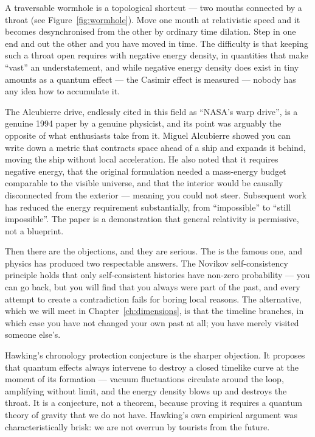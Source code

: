 A traversable wormhole is a topological shortcut --- two mouths connected by a throat (see Figure~\ref{fig:wormhole}). Move
one mouth at relativistic speed and it becomes desynchronised from the other by ordinary
time dilation. Step in one end and out the other and you have moved in time. The
difficulty is that keeping such a throat open requires  with negative
energy density, in quantities that make ``vast'' an understatement, and while negative
energy density does exist in tiny amounts as a quantum effect --- the Casimir effect is
measured --- nobody has any idea how to accumulate it.

\begin{funfact}
The Alcubierre drive, endlessly cited in this field as ``NASA's warp drive'', is a genuine
1994 paper by a genuine physicist, and its point was arguably the opposite of what
enthusiasts take from it. Miguel Alcubierre showed you can write down a metric that
contracts space ahead of a ship and expands it behind, moving the ship without local
acceleration. He also noted that it requires negative energy, that the original
formulation needed a mass-energy budget comparable to the visible universe, and that the
interior would be causally disconnected from the exterior --- meaning you could not steer.
Subsequent work has reduced the energy requirement substantially, from ``impossible'' to
``still impossible''. The paper is a demonstration that general relativity is permissive,
not a blueprint.
\end{funfact}

Then there are the objections, and they are serious. The  is the
famous one, and physics has produced two respectable answers. The Novikov self-consistency
principle holds that only self-consistent histories have non-zero probability --- you can
go back, but you will find that you always were part of the past, and every attempt to
create a contradiction fails for boring local reasons. The alternative, which we will meet
in Chapter~\ref{ch:dimensions}, is that the timeline branches, in which case you have not
changed your own past at all; you have merely visited someone else's.

Hawking's chronology protection conjecture is the sharper objection. It proposes that
quantum effects always intervene to destroy a closed timelike curve at the moment of its
formation --- vacuum fluctuations circulate around the loop, amplifying without limit, and
the energy density blows up and destroys the throat. It is a conjecture, not a theorem,
because proving it requires a quantum theory of gravity that we do not have. Hawking's own
empirical argument was characteristically brisk: we are not overrun by tourists from the
future.


